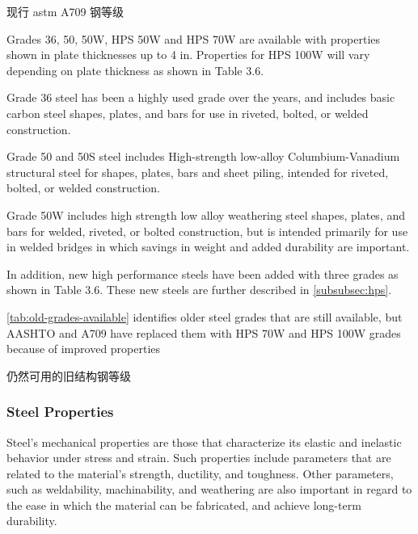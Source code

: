 \begin{table}
  \caption{现行 \acrshort*{astm} A709 钢等级}
  \label{tab:astm-steel-grades}
  
\end{table}

Grades 36, 50, 50W, HPS 50W and HPS 70W are available with properties shown in plate thicknesses up to 4 in. Properties for HPS 100W will vary depending on plate thickness as shown in Table 3.6.

Grade 36 steel has been a highly used grade over the years, and includes basic carbon steel shapes, plates, and bars for use in riveted, bolted, or welded construction.

Grade 50 and 50S steel includes High-strength low-alloy Columbium-Vanadium structural steel for shapes, plates, bars and sheet piling, intended for riveted, bolted, or welded construction.

Grade 50W includes high strength low alloy weathering steel shapes, plates, and bars for welded, riveted, or bolted construction, but is intended primarily for use in welded bridges in which savings in weight and added durability are important.

In addition, new high performance steels have been added with three grades as shown in Table 3.6. These new steels are further described in \cref{subsubsec:hps}.

\cref{tab:old-grades-available} identifies older steel grades that are still available, but AASHTO and A709 have replaced them with HPS 70W and HPS 100W grades because of improved properties

\begin{table}
  \caption{仍然可用的旧结构钢等级}
  \label{tab:old-grades-available}
  
\end{table}

\subsubsection{Steel Properties}
Steel’s mechanical properties are those that characterize its elastic and inelastic behavior under stress and strain. Such properties include parameters that are related to the material’s strength, ductility, and toughness. Other parameters, such as weldability, machinability, and weathering are also important in regard to the ease in which the material can be fabricated, and achieve long-term durability.

